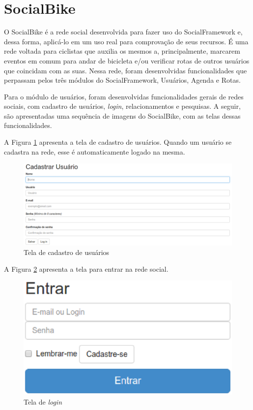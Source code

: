 \section{SocialBike}
\label{sec:SocialBike}

O SocialBike é a rede social desenvolvida para fazer uso do SocialFramework e, dessa forma, aplicá-lo em um uso real para comprovação de seus recursos. É uma rede voltada para ciclistas que auxilia os mesmos a, principalmente, marcarem eventos em comum para andar de bicicleta e/ou verificar rotas de outros usuários que coincidam com as suas. Nessa rede, foram desenvolvidas funcionalidades que perpassam pelos três módulos do SocialFramework, Usuários, Agenda e Rotas.

Para o módulo de usuários, foram desenvolvidas funcionalidades gerais de redes sociais, com cadastro de usuários, \textit{login}, relacionamentos e pesquisas. A seguir, são apresentadas uma sequência de imagens do SocialBike, com as telas dessas funcionalidades.

A Figura \ref{cadastrar_usuario} apresenta a tela de cadastro de usuários. Quando um usuário se cadastra na rede, esse é automaticamente logado na mesma.

\newpage
\begin{figure}[!h]
	\centering
	\includegraphics[scale=0.4]{figuras/resultados/cadastrar_usuario.eps}
	\caption[Tela de cadastro de usuários]{Tela de cadastro de usuários}
	\label{cadastrar_usuario}
\end{figure}

A Figura \ref{login} apresenta a tela para entrar na rede social.

\begin{figure}[!h]
	\centering
	\includegraphics[scale=0.5]{figuras/resultados/login.eps}
	\caption[Tela de login]{Tela de \textit{login}}
	\label{login}
\end{figure}

